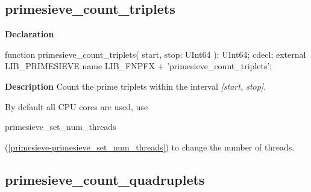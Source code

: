 \documentclass{report}
\newif\ifpdf
\begin{document}
\subsection*{primesieve{\_}count{\_}triplets}
\fi
\label{primesieve-primesieve_count_triplets}
\begin{list}{}{
\setlength{\itemindent}{0cm}
\setlength{\listparindent}{0cm}
\setlength{\leftmargin}{\evensidemargin}
\addtolength{\leftmargin}{\tmplength}
\settowidth{\labelsep}{X}
\addtolength{\leftmargin}{\labelsep}
\setlength{\labelwidth}{\tmplength}
}
\item[\textbf{Declaration}\hfill]
\ifpdf
\begin{flushleft}
\fi
\begin{ttfamily}
function primesieve{\_}count{\_}triplets( start, stop: UInt64 ): UInt64; cdecl; external LIB{\_}PRIMESIEVE name LIB{\_}FNPFX + 'primesieve{\_}count{\_}triplets';\end{ttfamily}

\ifpdf
\end{flushleft}
\fi

\par
\item[\textbf{Description}]
Count the prime triplets within the interval \textit{[start, stop]}.

By default all CPU cores are used, use \begin{ttfamily}primesieve{\_}set{\_}num{\_}threads\end{ttfamily}(\ref{primesieve-primesieve_set_num_threads}) to change the number of threads.

\end{list}
\ifpdf
\subsection*{\large{\textbf{primesieve{\_}count{\_}quadruplets}}\normalsize\hspace{1ex}\hrulefill}
\else
\end{document}
